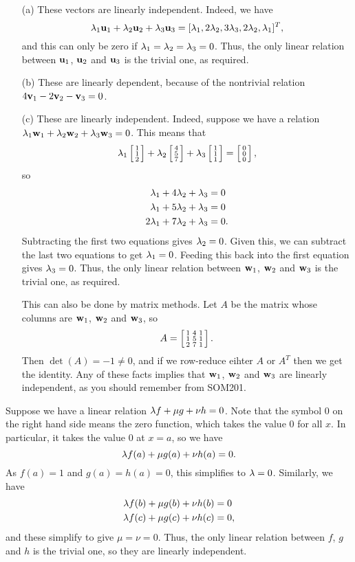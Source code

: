  \begin{itemize}
  \item[(a)] These vectors are linearly independent.
   Indeed, we have
   \[ \lambda_1\mathbf{u}_1+\lambda_2\mathbf{u}_2+\lambda_3\mathbf{u}_3 =
       [\lambda_1,2\lambda_2,3\lambda_3,2\lambda_2,\lambda_1]^T,
   \]
   and this can only be zero if $\lambda_1=\lambda_2=\lambda_3=0$.
   Thus, the only linear relation between $\mathbf{u}_1$, $\mathbf{u}_2$
   and $\mathbf{u}_3$ is the trivial one, as required.
  \item[(b)] These are linearly dependent, because of the
   nontrivial relation $4\mathbf{v}_1-2\mathbf{v}_2-\mathbf{v}_3=0$.
  \item[(c)] These are linearly independent.  Indeed,
   suppose we have a relation
   $\lambda_1\mathbf{w}_1+\lambda_2\mathbf{w}_2+\lambda_3\mathbf{w}_3=0$.  This means that
   \[ \lambda_1\left[\begin{smallmatrix} 1\\1\\2\end{smallmatrix}\right] +
      \lambda_2\left[\begin{smallmatrix} 4\\5\\7\end{smallmatrix}\right] +
      \lambda_3\left[\begin{smallmatrix} 1\\1\\1\end{smallmatrix}\right] = \left[\begin{smallmatrix} 0\\0\\0\end{smallmatrix}\right] ,
   \]
   so
   \begin{align*}
    \lambda_1 + 4\lambda_2 + \lambda_3  &= 0 \\
    \lambda_1 + 5\lambda_2 + \lambda_3  &= 0 \\
    2\lambda_1 + 7\lambda_2 + \lambda_3 &= 0.
   \end{align*}
   Subtracting the first two equations gives $\lambda_2=0$.
   Given this, we can subtract the last two equations to get
   $\lambda_1=0$.  Feeding this back into the first equation
   gives $\lambda_3=0$.  Thus, the only linear relation between
   $\mathbf{w}_1$, $\mathbf{w}_2$ and $\mathbf{w}_3$ is the trivial one, as
   required.

   This can also be done by matrix methods.  Let $A$ be the
   matrix whose columns are $\mathbf{w}_1$, $\mathbf{w}_2$ and $\mathbf{w}_3$, so
   \[ A = \left[\begin{smallmatrix} 1 & 4 & 1 \\ 1 & 5 & 1 \\ 2 & 7 & 1 \end{smallmatrix}\right]. \]
   Then $\det(A)=-1\neq 0$, and if we row-reduce eihter $A$
   or $A^T$ then we get the identity.  Any of these facts
   implies that $\mathbf{w}_1$, $\mathbf{w}_2$ and $\mathbf{w}_3$ are linearly
   independent, as you should remember from SOM201.
 \end{itemize}
\EndDeferredSolution

 Suppose we have a linear relation $\lambda f+\mu g+\nu h=0$.
 Note that the symbol $0$ on the right hand side means the
 zero function, which takes the value $0$ for all $x$.  In
 particular, it takes the value $0$ at $x=a$, so we have
 \[ \lambda f(a) + \mu g(a) + \nu h(a) = 0. \]
 As $f(a)=1$ and $g(a)=h(a)=0$, this simplifies to $\lambda=0$.
 Similarly, we have
 \begin{align*}
  \lambda f(b) + \mu g(b) + \nu h(b) &= 0 \\
  \lambda f(c) + \mu g(c) + \nu h(c) &= 0,
 \end{align*}
 and these simplify to give $\mu=\nu=0$.  Thus, the only
 linear relation between $f$, $g$ and $h$ is the trivial
 one, so they are linearly independent.
\EndDeferredSolution

